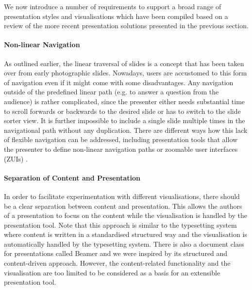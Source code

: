     We now introduce a number of requirements to support a broad range of
    presentation styles and visualisations which have been compiled based on a
    review of the more recent presentation solutions presented in the previous
    section.

     \paragraph{Non-linear Navigation} As outlined earlier, the linear
      traversal of slides is a concept that has been taken over from early
      photographic slides. Nowadays, users are accustomed to this form of
      navigation even if it might come with some disadvantages. Any navigation
      outside of the predefined linear path (e.g. to answer a question from the
      audience) is rather complicated, since the presenter either needs
      substantial time to scroll forwards or backwards to the desired slide or
      has to switch to the slide sorter view. It is further impossible to
      include a single slide multiple times in the navigational path without
      any duplication. There are different ways how this lack of flexible
      navigation can be addressed, including presentation tools that allow the
      presenter to define non-linear navigation paths \citep{spicer-1}
      \citep{edge-1} or zoomable user interfaces (ZUIs) \citep{good-1}
      \citep{lichtschlag-1} \citep{haller-1}.

     \paragraph{Separation of Content and Presentation} In order to facilitate
      experimentation with different visualisations, there should be a clear
      separation between content and presentation. This allows the authors of a
      presentation to focus on the content while the visualisation is handled
      by the presentation tool. Note that this approach is similar to the
      \latex typesetting system where content is written in a standardised
      structured way and the visualisation is automatically handled by the
      typesetting system. There is also a \latex document class for
      presentations called Beamer and we were inspired by its structured and
      content-driven approach. However, the content-related functionality and
      the visualisation are too limited to be considered as a basis for an
      extensible presentation tool.

